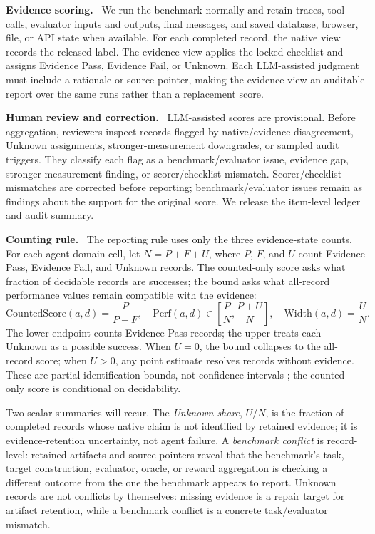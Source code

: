 \documentclass{article}
\newcommand{\evidencePass}{Evidence Pass\xspace}
\newcommand{\evidenceFail}{Evidence Fail\xspace}
\newcommand{\unknownLabel}{Unknown\xspace}
\newcommand{\runin}[1]{\noindent\textbf{#1}\ }
\begin{document}
\runin{Evidence scoring.}
We run the benchmark normally and retain traces, tool calls, evaluator inputs
and outputs, final messages, and saved database, browser, file, or API state
when available. For each completed record, the native view records the released
label. The evidence view applies the locked checklist and assigns
\evidencePass, \evidenceFail, or \unknownLabel. Each LLM-assisted judgment must
include a rationale or source pointer, making the evidence view an auditable
report over the same runs rather than a replacement score.

\runin{Human review and correction.}
LLM-assisted scores are provisional. Before aggregation, reviewers inspect
records flagged by native/evidence disagreement, \unknownLabel assignments,
stronger-measurement downgrades, or sampled audit triggers. They classify each
flag as a benchmark/evaluator issue, evidence gap, stronger-measurement
finding, or scorer/checklist mismatch. Scorer/checklist mismatches are
corrected before reporting; benchmark/evaluator issues remain as findings about
the support for the original score. We release the item-level ledger and audit
summary.

\runin{Counting rule.}
\label{sec:bounds}
The reporting rule uses only the three evidence-state counts. For each
agent-domain cell, let \(N=P+F+U\), where \(P\), \(F\), and \(U\) count
\evidencePass, \evidenceFail, and \unknownLabel records. The counted-only score
asks what fraction of decidable records are successes; the bound asks what
all-record performance values remain compatible with the evidence:
\[
\mathrm{CountedScore}(a,d)=\frac{P}{P+F},\quad
\mathrm{Perf}(a,d)\in\left[\frac{P}{N},\frac{P+U}{N}\right],\quad
\mathrm{Width}(a,d)=\frac{U}{N}.
\]
The lower endpoint counts \evidencePass records; the upper treats each
\unknownLabel as a possible success. When \(U=0\), the bound collapses to the
all-record score; when \(U>0\), any point estimate resolves records without
evidence. These are partial-identification bounds, not confidence intervals
\citep{manski2003partial}; the counted-only score is conditional on
decidability.

Two scalar summaries will recur. The \emph{Unknown share}, \(U/N\), is the
fraction of completed records whose native claim is not identified by retained
evidence; it is evidence-retention uncertainty, not agent failure. A
\emph{benchmark conflict} is record-level: retained artifacts and source
pointers reveal that the benchmark's task, target construction, evaluator,
oracle, or reward aggregation is checking a different outcome from the one the
benchmark appears to report. Unknown records are not conflicts by themselves:
missing evidence is a repair target for artifact retention, while a benchmark
conflict is a concrete task/evaluator mismatch.
\end{document}
